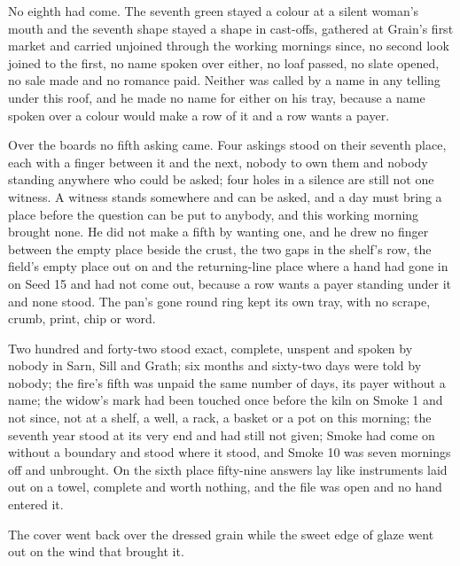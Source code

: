No eighth had come. The seventh green stayed a colour at a silent woman's mouth and the seventh shape stayed a shape in cast-offs, gathered at Grain's first market and carried unjoined through the working mornings since, no second look joined to the first, no name spoken over either, no loaf passed, no slate opened, no sale made and no romance paid. Neither was called by a name in any telling under this roof, and he made no name for either on his tray, because a name spoken over a colour would make a row of it and a row wants a payer.

Over the boards no fifth asking came. Four askings stood on their seventh place, each with a finger between it and the next, nobody to own them and nobody standing anywhere who could be asked; four holes in a silence are still not one witness. A witness stands somewhere and can be asked, and a day must bring a place before the question can be put to anybody, and this working morning brought none. He did not make a fifth by wanting one, and he drew no finger between the empty place beside the crust, the two gaps in the shelf's row, the field's empty place out on  and the returning-line place where a hand had gone in on Seed 15 and had not come out, because a row wants a payer standing under it and none stood. The pan's gone round ring kept its own tray, with no scrape, crumb, print, chip or word.

Two hundred and forty-two stood exact, complete, unspent and spoken by nobody in Sarn, Sill and Grath; six months and sixty-two days were told by nobody; the fire's fifth was unpaid the same number of days, its payer without a name; the widow's mark had been touched once before the kiln on Smoke 1 and not since, not at a shelf, a well, a rack, a basket or a pot on this morning; the seventh year stood at its very end and had still not given; Smoke had come on without a boundary and stood where it stood, and Smoke 10 was seven mornings off and unbrought. On the sixth place fifty-nine answers lay like instruments laid out on a towel, complete and worth nothing, and the file was open and no hand entered it.

The cover went back over the dressed grain while the sweet edge of glaze went out on the wind that brought it.
